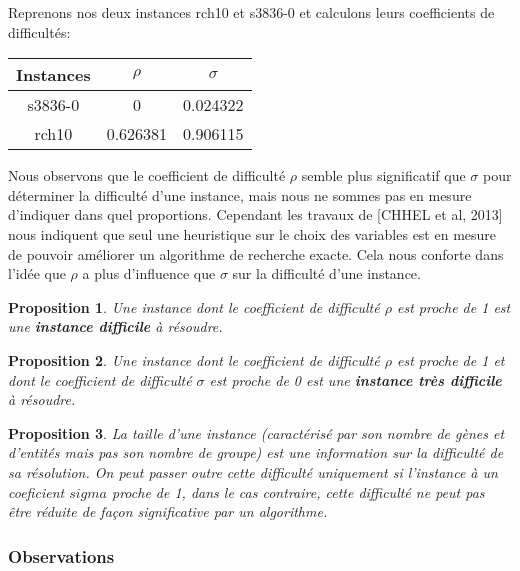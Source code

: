 \documentclass[a4paper,10pt]{article}
\newtheorem{proposition}{Proposition}
\begin{document}
Reprenons nos deux instances rch10 et s3836-0 et calculons leurs coefficients de difficultés:

\begin{center}
\begin{tabular}{|c|c|c|}
\hline 
Instances & $\rho$ & $\sigma$ \\ 
\hline 
s3836-0 & 0 & 0.024322 \\ 
\hline
rch10 & 0.626381 & 0.906115 \\ 
\hline
\end{tabular} 
\end{center}

Nous observons que le coefficient de difficulté $\rho$ semble plus significatif que $\sigma$ pour déterminer la difficulté d'une instance, mais nous ne sommes pas en mesure d'indiquer dans quel proportions. Cependant les travaux de [CHHEL et al, 2013] nous indiquent que seul une heuristique sur le choix des variables est en mesure de pouvoir améliorer un algorithme de recherche exacte. Cela nous conforte dans l'idée que $\rho$ a plus d'influence que $\sigma$ sur la difficulté d'une instance. 

\begin{proposition}
Une instance dont le coefficient de difficulté $\rho$ est proche de 1 est une \textbf{instance difficile} à résoudre.
\end{proposition}

\begin{proposition}
Une instance dont le coefficient de difficulté $\rho$ est proche de 1 et dont le coefficient de difficulté $\sigma$ est proche de 0 est une \textbf{instance très difficile} à résoudre.
\end{proposition}

\begin{proposition}
La taille d'une instance (caractérisé par son nombre de gènes et d'entités mais pas son nombre de groupe) est une information sur la difficulté de sa résolution. On peut passer outre cette difficulté uniquement si l'instance à un coeficient $sigma$ proche de 1, dans le cas contraire, cette difficulté ne peut pas être réduite de façon significative par un algorithme.
\end{proposition}


\subsubsection{Observations}
\end{document}
